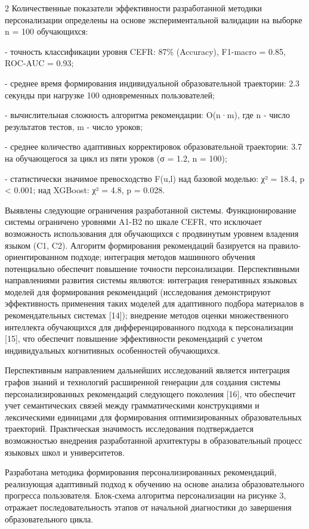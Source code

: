 \begin{multicols}{2}
Количественные показатели эффективности разработанной методики
персонализации определены на основе экспериментальной валидации на
выборке n = 100 обучающихся:

- точность классификации уровня CEFR: 87\% (Accuracy), F1-macro = 0.85,
ROC-AUC = 0.93;

- среднее время формирования индивидуальной образовательной траектории:
2.3 секунды при нагрузке 100 одновременных пользователей;

- вычислительная сложность алгоритма рекомендации: O(n·m), где n - число
результатов тестов, m - число уроков;

- среднее количество адаптивных корректировок образовательной
траектории: 3.7 на обучающегося за цикл из пяти уроков (σ = 1.2, n =
100);

- статистически значимое превосходство F(u,l) над базовой моделью: χ² =
18.4, p <{} 0.001; над XGBoost: χ² = 4.8, p = 0.028.

Выявлены следующие ограничения разработанной системы. Функционирование
системы ограничено уровнями A1-B2 по шкале CEFR, что исключает
возможность использования для обучающихся с продвинутым уровнем владения
языком (C1, C2). Алгоритм формирования рекомендаций базируется на
правило-ориентированном подходе; интеграция методов машинного обучения
потенциально обеспечит повышение точности персонализации. Перспективными
направлениями развития системы являются: интеграция генеративных
языковых моделей для формирования рекомендаций (исследования
демонстрируют эффективность применения таких моделей для адаптивного
подбора материалов в рекомендательных системах {[}14{]}); внедрение
методов оценки множественного интеллекта обучающихся для
дифференцированного подхода к персонализации {[}15{]}, что обеспечит
повышение эффективности рекомендаций с учетом индивидуальных когнитивных
особенностей обучающихся.

Перспективным направлением дальнейших исследований является интеграция
графов знаний и технологий расширенной генерации для создания системы
персонализированных рекомендаций следующего поколения {[}16{]}, что
обеспечит учет семантических связей между грамматическими конструкциями
и лексическими единицами для формирования оптимизированных
образовательных траекторий. Практическая значимость исследования
подтверждается возможностью внедрения разработанной архитектуры в
образовательный процесс языковых школ и университетов.

Разработана методика формирования персонализированных рекомендаций,
реализующая адаптивный подход к обучению на основе анализа
образовательного прогресса пользователя. Блок-схема алгоритма
персонализации на рисунке 3, отражает последовательность этапов от
начальной диагностики до завершения образовательного цикла.
\end{multicols}

